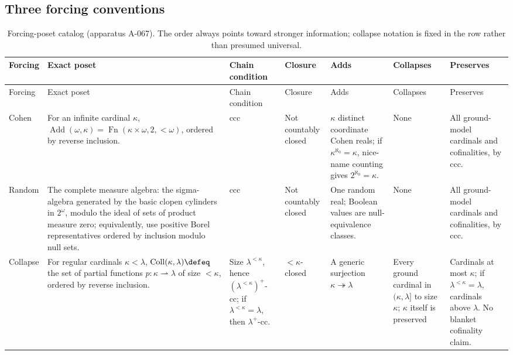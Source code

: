 \begin{landscape}
\subsection{Three forcing conventions}
\scriptsize
\setlength{\tabcolsep}{2.5pt}
\begin{longtable}{@{}p{.58in}p{1.78in}p{.58in}p{.68in}p{1.00in}
  p{1.00in}p{1.42in}@{}}
\caption{Forcing-poset catalog (apparatus A-067).  The order always points
toward stronger information; collapse notation is fixed in the row rather
than presumed universal.}\label{tab:p06-forcing-catalog}\\
\toprule
Forcing & Exact poset & Chain condition & Closure & Adds & Collapses & Preserves \\
\midrule
\endfirsthead
\toprule
Forcing & Exact poset & Chain condition & Closure & Adds & Collapses & Preserves \\
\midrule
\endhead
Cohen
& For an infinite cardinal \(\kappa\),
  \(\operatorname{Add}(\omega,\kappa)
    =\operatorname{Fn}(\kappa\times\omega,2,{<}\omega)\), ordered by reverse
  inclusion.
& ccc
& Not countably closed
& \(\kappa\) distinct coordinate Cohen reals; if
  \(\kappa^{\aleph_0}=\kappa\), nice-name counting gives
  \(2^{\aleph_0}=\kappa\).
& None
& All ground-model cardinals and cofinalities, by ccc. \\
\addlinespace
Random
& The complete measure algebra: the sigma-algebra generated by the basic
  clopen cylinders in \(2^\omega\), modulo the ideal of sets of product
  measure zero; equivalently, use positive Borel representatives ordered by
  inclusion modulo null sets.
& ccc
& Not countably closed
& One random real; Boolean values are null-equivalence classes.
& None
& All ground-model cardinals and cofinalities, by ccc. \\
\addlinespace
Collapse
& For regular cardinals \(\kappa<\lambda\),
  \(\operatorname{Coll}(\kappa,\lambda)\defeq\) the set of partial functions
  \(p:\kappa\rightharpoonup\lambda\) of size \(<\kappa\), ordered by reverse
  inclusion.
& Size \(\lambda^{<\kappa}\), hence
  \((\lambda^{<\kappa})^+\)-cc; if \(\lambda^{<\kappa}=\lambda\), then
  \(\lambda^+\)-cc.
& \({<}\kappa\)-closed
& A generic surjection \(\kappa\twoheadrightarrow\lambda\)
& Every ground cardinal in \((\kappa,\lambda]\) to size \(\kappa\);
  \(\kappa\) itself is preserved
& Cardinals at most \(\kappa\); if \(\lambda^{<\kappa}=\lambda\), cardinals
  above \(\lambda\).  No blanket cofinality claim. \\
\bottomrule
\end{longtable}
\end{landscape}
\endgroup

